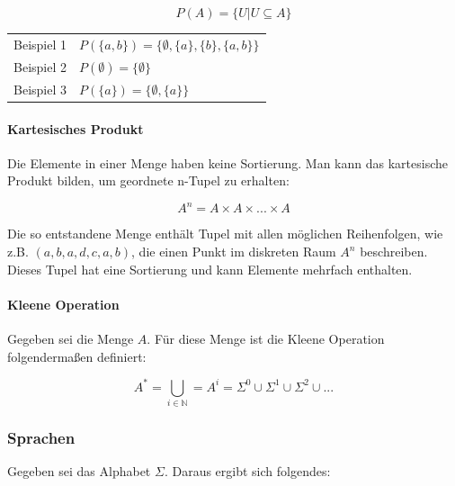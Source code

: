 \documentclass[../main.tex]{subfiles}
\begin{document}
                    \begin{equation}
                        P(A) = \{U | U \subseteq A\}
                    \end{equation}
                    
                    \begin{tabular}{ r l }
                    	Beispiel 1 & $P\left(\{a, b\}\right) = \{\emptyset, \{a\}, \{b\}, \{a, b\}\}$\\
                    	Beispiel 2 & $P\left(\emptyset\right) = \{\emptyset\}$\\
                    	Beispiel 3 & $P\left(\{a\}\right) = \{\emptyset, \{a\}\}$
					\end{tabular}
                    
            	\paragraph{Kartesisches Produkt}
                    Die Elemente in einer Menge haben keine Sortierung. Man kann das kartesische Produkt bilden, um geordnete n-Tupel zu erhalten:
                    
                    \begin{equation}
                        A^n = A \times A \times ... \times A
                    \end{equation}
                    
                    Die so entstandene Menge enthält Tupel mit allen möglichen Reihenfolgen, wie z.B. $\left(a, b, a, d, c, a, b\right)$, die einen Punkt im diskreten Raum $A^n$ beschreiben. Dieses Tupel hat eine Sortierung und kann Elemente mehrfach enthalten.
                    
                \paragraph{Kleene Operation}
                    Gegeben sei die Menge $A$. Für diese Menge ist die Kleene Operation folgendermaßen definiert:
                    
                    \begin{equation}
                        A^* = \bigcup_{i \in \mathbb{N} }= A^i=\Sigma^0\cup\Sigma^1\cup\Sigma^2\cup ...
                    \end{equation}
                
            \subsubsection{Sprachen}
                Gegeben sei das Alphabet $\Sigma$. Daraus ergibt sich folgendes:
                
\end{document}
